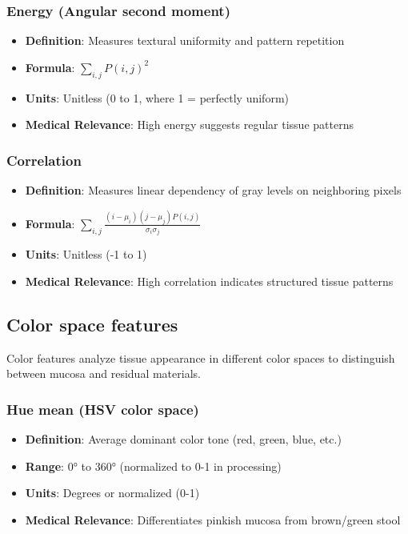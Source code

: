 \documentclass[11pt]{article}
\begin{document}
\subsubsection{Energy (Angular second moment)}
\begin{itemize}
    \item \textbf{Definition}: Measures textural uniformity and pattern repetition
    \item \textbf{Formula}: $\displaystyle \sum_{i,j} P(i,j)^2$
    \item \textbf{Units}: Unitless (0 to 1, where 1 = perfectly uniform)
    \item \textbf{Medical Relevance}: High energy suggests regular tissue patterns
\end{itemize}

\subsubsection{Correlation}
\begin{itemize}
    \item \textbf{Definition}: Measures linear dependency of gray levels on neighboring pixels
    \item \textbf{Formula}: $\displaystyle \sum_{i,j} \frac{(i-\mu_i)(j-\mu_j)P(i,j)}{\sigma_i\sigma_j}$
    \item \textbf{Units}: Unitless (-1 to 1)
    \item \textbf{Medical Relevance}: High correlation indicates structured tissue patterns
\end{itemize}

\subsection{Color space features}

Color features analyze tissue appearance in different color spaces to distinguish between mucosa and residual materials.

\subsubsection{Hue mean (HSV color space)}
\begin{itemize}
    \item \textbf{Definition}: Average dominant color tone (red, green, blue, etc.)
    \item \textbf{Range}: 0° to 360° (normalized to 0-1 in processing)
    \item \textbf{Units}: Degrees or normalized (0-1)
    \item \textbf{Medical Relevance}: Differentiates pinkish mucosa from brown/green stool
\end{itemize}
\end{document}

